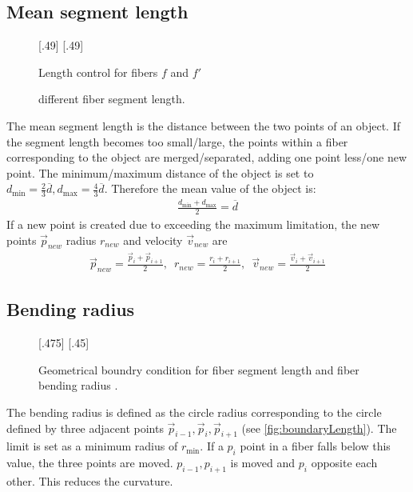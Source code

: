 \subsection{Mean segment length}
% 
\begin{figure}[!t]
    \centering
    \setlength{\tikzwidth}{.45\textwidth}
    [.49\textwidth]{
    }
    [.49\textwidth]{
    }
	\caption{Length control for fibers $f$ and $f'$}
	\label{fig:mergeSplit}
\end{figure}
% 
% 
\begin{figure}[!t]
    \centering
    \setlength{\tikzwidth}{0.75\textwidth}
    \tikzset{external/export next=false}
	\caption{different fiber segment length.}
	\label{fig:modelLength}
\end{figure}
% 
The mean segment length is the distance between the two points of an object.
If the segment length becomes too small/large, the points within a fiber corresponding to the object are merged/separated, adding one point less/one new point.
The minimum/maximum distance of the object is set to $d_{\min} = \frac{2}{3} \overline{d}, d_{\max} = \frac{4}{3}\overline{d}$.
Therefore the mean value of the object is:
\begin{align}
\frac{d_{\min} + d_{\max}}{2} = \overline{d}
\end{align}
% 
If a new point is created due to exceeding the maximum limitation, the new points $\vec{p}_{new}$ radius $r_{new}$ and velocity $\vec{v}_{new}$ are 
\begin{align}
\vec{p}_{new} = \frac{\vec{p}_{i} + \vec{p}_{i+1}}{2},\enspace
r_{new} = \frac{r_{i} + r_{i+1}}{2},\enspace
\vec{v}_{new} = \frac{\vec{v}_{i} + \vec{v}_{i+1}}{2}
\end{align}
% 
\subsection{Bending radius}
% 
\begin{figure}[!t]
    \centering
    \def\tikzheight{.40\textwidth}
    [.475\textwidth]{
    }\hfill
    [.45\textwidth]{
    }
	\caption{Geometrical boundry condition for fiber segment length \segLength and fiber bending radius \segRadius.}
	\label{fig:modelCircle}
\end{figure}
% 
The bending radius is defined as the circle radius corresponding to the circle defined by three adjacent points $\vec{p}_{i-1}, \vec{p}_{i}, \vec{p}_{i+1}$ (see \cref{fig:boundaryLength}). 
The limit is set as a minimum radius of $r_{\min}$.
If a $p_{i}$ point in a fiber falls below this value, the three points are moved.
$p_{i-1},p_{i+1}$ is moved \dummy{} and $p_{i}$ opposite each other.
This reduces the curvature.
\\
% 
